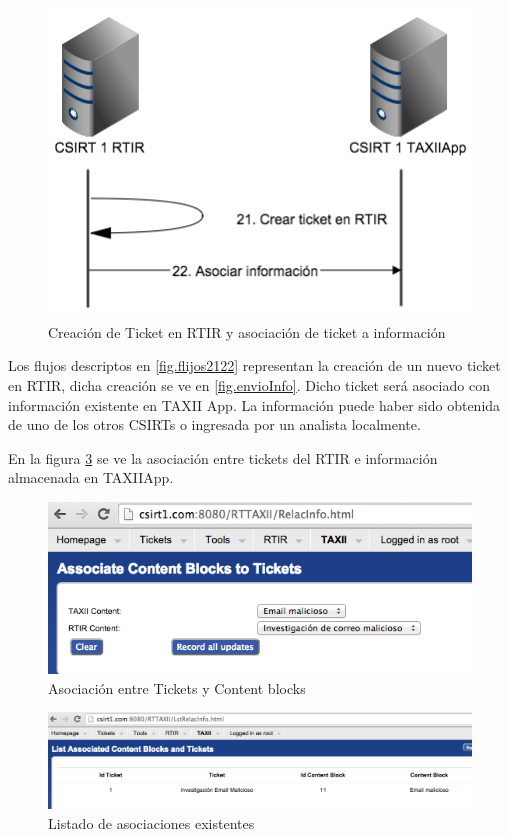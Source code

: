 \begin{figure}[H]
	\centering
	\includegraphics[scale=0.6]{flujos/flujo21-22.png}
	\caption{Creación de Ticket en RTIR y asociación de ticket a información}
	\label{fig.flujos2122}
\end{figure}

Los flujos descriptos en \ref{fig.flijos2122} representan la creación de un nuevo ticket en RTIR, dicha creación se ve en \ref{fig.envioInfo}. Dicho ticket será asociado con información existente en TAXII App. La información puede haber sido obtenida de uno de los otros CSIRTs o ingresada por un analista localmente.

En la figura \ref{fig.lstRelacInfo} se ve la asociación entre tickets del RTIR e información almacenada en TAXIIApp.

\begin{figure}[H]
	\centering
	\includegraphics[scale=0.4]{caso-de-estudio/relacInfo.png}
	\caption{Asociación entre Tickets y Content blocks}
	\label{fig.relacInfo}
\end{figure}

\begin{figure}[H]
	\centering
	\includegraphics[scale=0.4]{caso-de-estudio/lstRelacInfo.png}
	\caption{Listado de asociaciones existentes}
	\label{fig.lstRelacInfo}
\end{figure}

